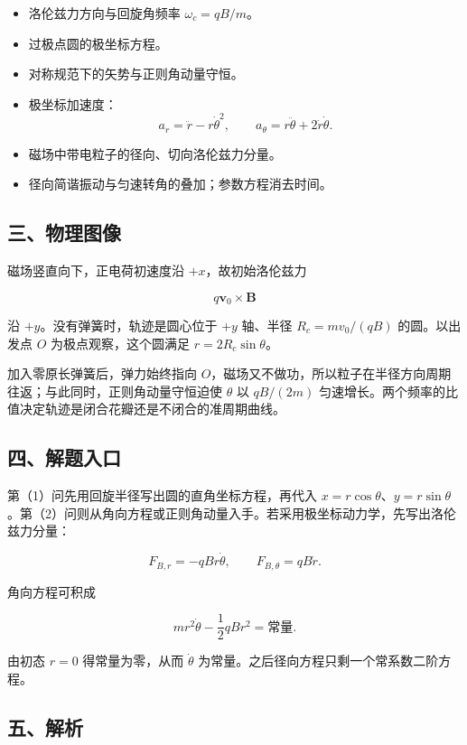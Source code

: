 \documentclass[12pt,a4paper,UTF8]{ctexart}
\newcommand{\tightlist}{\setlength{\itemsep}{0pt}\setlength{\parskip}{0pt}}
\begin{document}
\begin{itemize}
\tightlist
\item
  洛伦兹力方向与回旋角频率 \(\omega_c=qB/m\)。
\item
  过极点圆的极坐标方程。
\item
  对称规范下的矢势与正则角动量守恒。
\item
  极坐标加速度：
  \[a_r=\ddot r-r\dot\theta^2,\qquad a_\theta=r\ddot\theta+2\dot r\dot\theta.\]
\item
  磁场中带电粒子的径向、切向洛伦兹力分量。
\item
  径向简谐振动与匀速转角的叠加；参数方程消去时间。
\end{itemize}

\subsection{三、物理图像}\label{ux4e09ux7269ux7406ux56feux50cf-3}

磁场竖直向下，正电荷初速度沿 \(+x\)，故初始洛伦兹力

\[q\bm v_0\times\bm B\]

沿 \(+y\)。没有弹簧时，轨迹是圆心位于 \(+y\) 轴、半径 \(R_c=mv_0/(qB)\)
的圆。以出发点 \(O\) 为极点观察，这个圆满足 \(r=2R_c\sin\theta\)。

加入零原长弹簧后，弹力始终指向
\(O\)，磁场又不做功，所以粒子在半径方向周期往返；与此同时，正则角动量守恒迫使
\(\theta\) 以 \(qB/(2m)\)
匀速增长。两个频率的比值决定轨迹是闭合花瓣还是不闭合的准周期曲线。

\subsection{四、解题入口}\label{ux56dbux89e3ux9898ux5165ux53e3-3}

第（1）问先用回旋半径写出圆的直角坐标方程，再代入
\(x=r\cos\theta\)、\(y=r\sin\theta\)。第（2）问则从角向方程或正则角动量入手。若采用极坐标动力学，先写出洛伦兹力分量：

\[F_{B,r}=-qBr\dot\theta,\qquad F_{B,\theta}=qB\dot r.\]

角向方程可积成

\[mr^2\dot\theta-\frac12qBr^2=\text{常量}.\]

由初态 \(r=0\) 得常量为零，从而 \(\dot\theta\)
为常量。之后径向方程只剩一个常系数二阶方程。

\subsection{五、解析}\label{ux4e94ux89e3ux6790-3}
\end{document}
